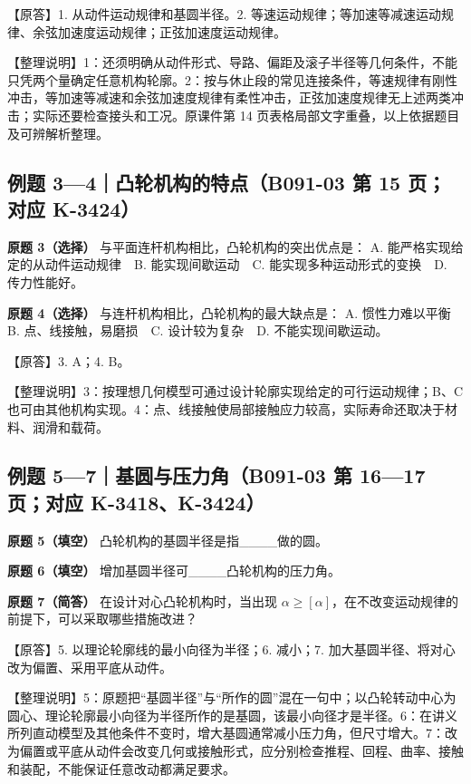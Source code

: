\documentclass[zihao=5,a4paper,UTF8,fontset=fandol]{ctexart}
\begin{document}
【原答】1. 从动件运动规律和基圆半径。2. 等速运动规律；等加速等减速运动规律、余弦加速度运动规律；正弦加速度运动规律。


【整理说明】1：还须明确从动件形式、导路、偏距及滚子半径等几何条件，不能只凭两个量确定任意机构轮廓。2：按与休止段的常见连接条件，等速规律有刚性冲击，等加速等减速和余弦加速度规律有柔性冲击，正弦加速度规律无上述两类冲击；实际还要检查接头和工况。原课件第 14 页表格局部文字重叠，以上依据题目及可辨解析整理。


\subsection{例题 3—4｜凸轮机构的特点（B091-03 第 15 页；对应 K-3424）}

\textbf{原题 3（选择）} 与平面连杆机构相比，凸轮机构的突出优点是：
A. 能严格实现给定的从动件运动规律　B. 能实现间歇运动　C. 能实现多种运动形式的变换　D. 传力性能好。


\textbf{原题 4（选择）} 与连杆机构相比，凸轮机构的最大缺点是：
A. 惯性力难以平衡　B. 点、线接触，易磨损　C. 设计较为复杂　D. 不能实现间歇运动。


【原答】3. A；4. B。


【整理说明】3：按理想几何模型可通过设计轮廓实现给定的可行运动规律；B、C 也可由其他机构实现。4：点、线接触使局部接触应力较高，实际寿命还取决于材料、润滑和载荷。




\subsection{例题 5—7｜基圆与压力角（B091-03 第 16—17 页；对应 K-3418、K-3424）}

\textbf{原题 5（填空）} 凸轮机构的基圆半径是指\_\_\_\_做的圆。


\textbf{原题 6（填空）} 增加基圆半径可\_\_\_\_凸轮机构的压力角。


\textbf{原题 7（简答）} 在设计对心凸轮机构时，当出现 $\alpha\ge[\alpha]$，在不改变运动规律的前提下，可以采取哪些措施改进？


【原答】5. 以理论轮廓线的最小向径为半径；6. 减小；7. 加大基圆半径、将对心改为偏置、采用平底从动件。


【整理说明】5：原题把“基圆半径”与“所作的圆”混在一句中；以凸轮转动中心为圆心、理论轮廓最小向径为半径所作的是基圆，该最小向径才是半径。6：在讲义所列直动模型及其他条件不变时，增大基圆通常减小压力角，但尺寸增大。7：改为偏置或平底从动件会改变几何或接触形式，应分别检查推程、回程、曲率、接触和装配，不能保证任意改动都满足要求。
\end{document}
